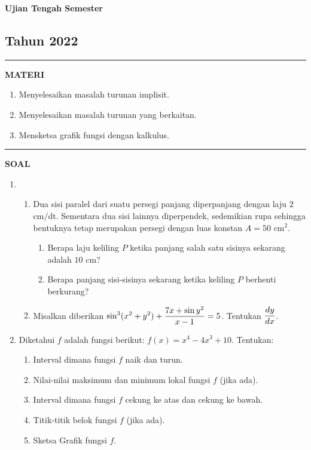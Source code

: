 \newpage
\begin{flushright}
    \textbf{\Large{Ujian Tengah Semester}}
    \subsection*{Tahun 2022}
\end{flushright}
\vspace{0.5cm}
\hrule height 2pt
\vspace{0.5cm}
\begin{center}
    \textbf{\large{MATERI}}
    \begin{enumerate}[leftmargin=*, label={\arabic*}.]
        \item Menyelesaikan masalah turunan implisit.
        \item Menyelesaikan masalah turunan yang berkaitan.
        \item Mensketsa grafik fungsi dengan kalkulus.
    \end{enumerate}
\end{center}
\vspace{0.2cm}
\hrule height 1pt
\vspace{0.5cm}
\begin{center}
    \textbf{\large{SOAL}}
\end{center}
\begin{enumerate}[leftmargin=*, label={\arabic*}.]
\item 
\begin{enumerate}[label={\alph*}.]
    \item Dua sisi paralel dari suatu persegi panjang diperpanjang dengan laju 
    $2$ cm/dt. Sementara dua sisi lainnya diperpendek, sedemikian rupa sehingga 
    bentuknya tetap merupakan persegi dengan luas konstan $A=50$ cm$^2$.
    \begin{enumerate}[label={\roman*}.]
        \item Berapa laju keliling $P$ ketika panjang salah satu sisinya sekarang 
        adalah $10$ cm?
        \item Berapa panjang sisi-sisinya sekarang ketika keliling $P$ berhenti 
        berkurang?
    \end{enumerate}
    \item Misalkan diberikan $\displaystyle\sin^{3}(x^2+y^2)+\frac{7x+\sin y^{2}}{x-1}=5$.
    Tentukan $\displaystyle\frac{dy}{dx}$.
\end{enumerate}
\item Diketahui $f$ adalah fungsi berikut: $f(x)=x^{4}-4x^{3}+10$. Tentukan:
\begin{enumerate}[label={\alph*}.]
    \item Interval dimana fungsi $f$ naik dan turun.
    \item Nilai-nilai maksimum dan minimum lokal fungsi $f$ (jika ada).
    \item Interval dimana fungsi $f$ cekung ke atas dan cekung ke bawah.
    \item Titik-titik belok fungsi $f$ (jika ada).
    \item Sketsa Grafik fungsi $f$.
\end{enumerate}

\end{enumerate}

